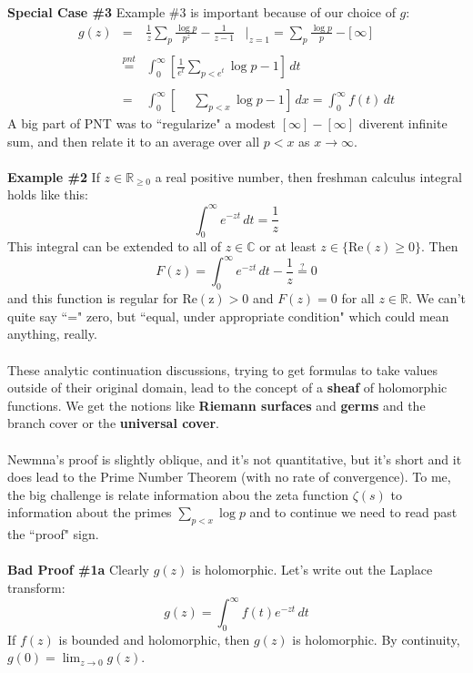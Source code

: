\documentclass[12pt]{article}
\begin{document}
\noindent \textbf{Special Case \#3} Example \#3 is important because of our choice of $g$:
\begin{eqnarray*} g(z) &=& \frac{1}{z} \sum_p \frac{\log p}{p^z} - \frac{1}{z-1} 
 \;\;\;\Bigg|_{z=1} = \sum_p \frac{\log p}{p} - \big[ \,\infty \,\big] \\ \\
&\stackrel{pnt}{=}& \int_0^\infty \left[ \frac{1}{e^t} \sum_{p < e^t} \log p - 1 \right] \, dt \\ \\
&=& \int_0^\infty \left[\;\;\;\;\,  \sum_{p < x} \log p - 1 \right] \, dx = \int_0^\infty f(t) \, dt\end{eqnarray*}
A big part of PNT was to ``regularize" a modest $[\infty] - [ \infty]$ diverent infinite sum, and then relate it to an average over all $p < x$ as $x \to \infty$. \\ \\
\textbf{Example \#2} If $z \in \mathbb{R}_{\geq 0}$ a real positive number, then freshman calculus integral holds like this:
$$ \int_0^\infty e^{-zt} \, dt = \frac{1}{z} $$
This integral can be extended to all of $z \in \mathbb{C}$ or at least $z \in \{  \mathrm{Re}(z) \geq 0\}$.  Then
$$ F(z) = \int_0^\infty e^{-zt} \, dt - \frac{1}{z}  \stackrel{?}{=} 0 $$
and this function is regular for $\mathrm{Re(z)} > 0$ and $F(z) = 0$ for all $z \in \mathbb{R}$.   We can't quite say ``=" zero, but ``equal, under appropriate condition" which could mean anything, really. \\ \\
These analytic continuation discussions, trying to get formulas to take values outside of their original domain, lead to the concept of a \textbf{sheaf} of holomorphic functions.  We get the notions like \textbf{Riemann surfaces} and \textbf{germs} and the branch cover or the \textbf{universal cover}.  \\ \\
Newmna's proof is slightly oblique, and it's not quantitative, but it's short and it does lead to the Prime Number Theorem (with no rate of convergence).  To me, the big challenge is relate information abou the zeta function $\zeta(s)$ to information about the primes $\sum_{p < x} \log p$ and to continue we need to read past the ``proof" sign. \\ \\
\textbf{Bad Proof \#1a} Clearly $g(z)$ is holomorphic.  Let's write out the Laplace transform:
$$ g(z) = \int_0^\infty f(t) e^{-zt} \, dt $$
If $f(z)$ is bounded and holomorphic, then $g(z)$ is holomorphic.  By continuity, $g(0) = \lim_{z \to 0} g(z)$. 
\end{document}
